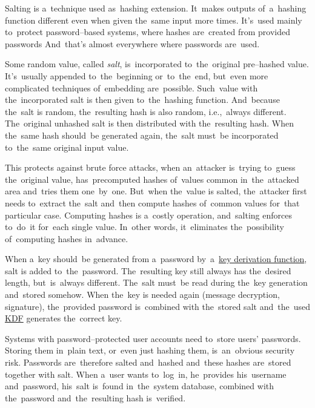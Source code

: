 \label{salt}
Salting is a~technique used as~hashing extension.
It~makes outputs of~a~hashing function different even when given the~same input more times.
It's~used mainly to~protect password--based systems, where hashes are~created from provided passwords
And~that's almost everywhere where passwords are~used.

Some random value, called \textit{salt}, is~incorporated to~the~original pre--hashed value.
It's~usually appended to~the~beginning or~to~the~end, but~even more complicated techniques of~embedding are~possible.
Such~value with the~incorporated salt is then given to~the~hashing function.
And~because the~salt is random, the~resulting hash is also random, i.e.,~always different.
The~original unhashed salt is then distributed with the~resulting hash.
When the~same hash should~be generated again, the~salt must~be incorporated to~the~same original input value.

This protects against brute force attacks, when an~attacker is~trying to~guess the~original value, has~precomputed hashes of~values common in~the~attacked area and~tries them one~by~one.
But~when the~value is salted, the~attacker first needs to~extract the~salt and~then compute hashes of~common values for~that particular case.
Computing hashes is a~costly operation, and~salting enforces to~do~it for~each single value.
In~other words, it~eliminates the~possibility of~computing hashes in~advance.

When a~key should~be generated from a~password by~a~\hyperref[keypassword]{key derivation function}, salt is added to~the~password.
The~resulting key still always has the~desired length, but~is~always different.
The~salt must~be read during the~key generation and~stored somehow.
When the~key is needed again (message decryption, signature), the~provided password is~combined with the~stored salt and~the~used \hyperref[keypassword]{KDF} generates the~correct key.
\newpage

Systems with password--protected user accounts need to~store users' passwords.
Storing them in~plain text, or~even just hashing them, is~an~obvious security risk.
Passwords are~therefore salted and~hashed and~these hashes are~stored together with salt.
When a~user wants to~log~in, he~provides his~username and~password, his~salt is~found in~the~system database, combined with the~password and~the~resulting hash is~verified.
